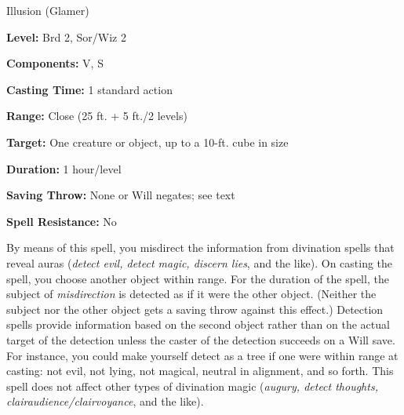 
Illusion (Glamer)

\textbf{Level:} Brd 2, Sor/Wiz 2

\textbf{Components:} V, S

\textbf{Casting Time:} 1 standard action

\textbf{Range:} Close (25 ft. + 5 ft./2 levels)

\textbf{Target:} One creature or object, up to a 10-ft. cube in size

\textbf{Duration:} 1 hour/level

\textbf{Saving Throw:} None or Will negates; see text

\textbf{Spell Resistance:} No

By means of this spell, you misdirect the information from divination spells that 
reveal auras (\textit{detect evil, detect magic, discern lies}, and the like). 
On casting the spell, you choose another object within range. For the duration 
of the spell, the subject of \textit{misdirection} is detected as if it were the 
other object. (Neither the subject nor the other object gets a saving throw against 
this effect.) Detection spells provide information based on the second object rather 
than on the actual target of the detection unless the caster of the detection succeeds 
on a Will save. For instance, you could make yourself detect as a tree if one were 
within range at casting: not evil, not lying, not magical, neutral in alignment, 
and so forth. This spell does not affect other types of divination magic (\textit{augury, 
detect thoughts, clairaudience/clairvoyance}, and the like).


